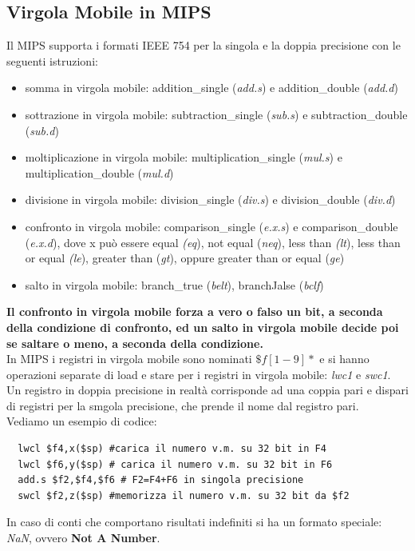 \documentclass[a4paper,12pt, oneside]{book}
\begin{document}
\subsection{Virgola Mobile in MIPS}
Il MIPS supporta i formati IEEE 754 per la singola e la doppia precisione con le seguenti istruzioni:
\begin{itemize}
  \item somma in virgola mobile: addition\_single (\textit{add.s}) e addition\_double (\textit{add.d})
  \item sottrazione in virgola mobile: subtraction\_single (\textit{sub.s}) e subtraction\_double (\textit{sub.d})
  \item moltiplicazione in virgola mobile: multiplication\_single (\textit{mul.s}) e multiplication\_double (\textit{mul.d})
  \item divisione in virgola mobile: division\_single (\textit{div.s}) e division\_double (\textit{div.d})
  \item confronto in virgola mobile: comparison\_single (\textit{e.x.s}) e comparison\_double (\textit{e.x.d}), dove x può essere equal \textit{(eq}), not equal (\textit{neq}), less than \textit{(lt}), less than or equal \textit{(le}), greater than (\textit{gt}), oppure greater than or equal (\textit{ge})
  \item salto in virgola mobile: branch\_true (\textit{belt}), branchJalse (\textit{bclf})
\end{itemize}
\textbf{Il confronto in virgola mobile forza a vero o falso un bit, a seconda della condizione
  di confronto, ed un salto in virgola mobile decide poi se saltare o meno, a seconda della condizione.}\\
In MIPS i registri in virgola mobile sono nominati $\$f[1-9]*$ e si hanno operazioni separate di load e stare per i registri in virgola
mobile: \textit{lwc1} e \textit{swc1}. Un registro in doppia precisione in realtà corrisponde ad una coppia pari e dispari
di registri per la smgola precisione, che prende il nome dal registro pari.\\
Vediamo un esempio di codice:
\begin{verbatim}
  lwcl $f4,x($sp) #carica il numero v.m. su 32 bit in F4
  lwcl $f6,y($sp) # carica il numero v.m. su 32 bit in F6
  add.s $f2,$f4,$f6 # F2=F4+F6 in singola precisione
  swcl $f2,z($sp) #memorizza il numero v.m. su 32 bit da $f2
\end{verbatim}
In caso di conti che comportano risultati indefiniti si ha un formato speciale: \textit{NaN}, ovvero \textbf{Not A Number}.\\
\end{document}
